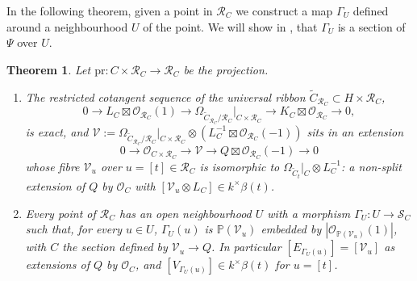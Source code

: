 \documentclass[11pt,twoside]{amsart}
\theoremstyle{plain}
\newtheorem{theorem}{Theorem}[section]
\theoremstyle{definition}
\newcommand{\PP}{\mathbb{P}}
\newcommand{\OO}{\mathcal{O}}
\newcommand{\Ct}{\widetilde{C}}
\newcommand{\SC}{\mathcal{S}_C}
\newcommand{\RC}{\mathcal{R}_C}
\newcommand{\pr}{\mathrm{pr}}
\begin{document}
In the following theorem, given a point in $\mathcal{R}_C$ we construct a map $\Gamma_U$ defined around a neighbourhood $U$ of the point. We will show in , that $\Gamma_U$ is a section of $\Psi$ over $U$.

\begin{theorem}\label{thm:Gamma}
Let $\pr\colon C\times\RC\to\RC$ be the projection.
\begin{enumerate}
\item The restricted cotangent sequence of the universal ribbon $\Ct_{\RC}\subset H\times\RC$,
\begin{equation}\label{eq:relcot}
0\to L_C\boxtimes\OO_{\RC}(1)\to\Omega_{\Ct_{\RC}/\RC}|_{C\times\RC}\to K_C\boxtimes\OO_{\RC}\to0,
\end{equation}
is exact, and $\mathcal{V}:=\Omega_{\Ct_{\RC}/\RC}|_{C\times\RC}\otimes(L_C^{-1}\boxtimes\OO_{\RC}(-1))$ sits in an extension
\begin{equation}\label{eq:VR}
0\to\OO_{C\times\RC}\to\mathcal{V}\to Q\boxtimes\OO_{\RC}(-1)\to0
\end{equation}
whose fibre $\mathcal{V}_u$ over $u=[t]\in\RC$ is isomorphic to $\Omega_{\Ct_t}|_C\otimes L_C^{-1}$: a non-split extension of $Q$ by $\OO_C$ with $[\mathcal{V}_u\otimes L_C]\in k^{\times}\beta(t)$.
\item Every point of $\RC$ has an open neighbourhood $U$ with a morphism $\Gamma_U\colon U\to\SC$ such that, for every $u\in U$, $\Gamma_U(u)$ is $\PP(\mathcal{V}_u)$ embedded by $|\OO_{\PP(\mathcal{V}_u)}(1)|$, with $C$ the section defined by $\mathcal{V}_u\to Q$. In particular $[E_{\Gamma_U(u)}]=[\mathcal{V}_u]$ as extensions of $Q$ by $\OO_C$, and $[V_{\Gamma_U(u)}]\in k^{\times}\beta(t)$ for $u=[t]$.
\end{enumerate}
\end{theorem}
\end{document}
